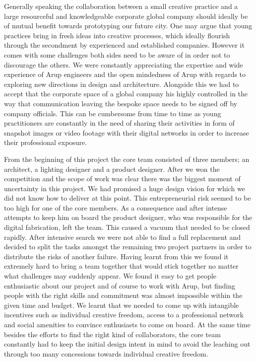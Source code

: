 Generally speaking the collaboration between a small creative practice and a large resourceful and knowledgeable corporate global company should ideally be of mutual benefit towards prototyping our future city. One may argue that young practices bring in fresh ideas into creative processes, which ideally flourish through the secondment by experienced and established companies. However it comes with some challenges both sides need to be aware of in order not to discourage the others. We were constantly appreciating the expertise and wide experience of Arup engineers and the open mindedness of Arup with regards to exploring new directions in design and architecture. Alongside this we had to accept that the corporate space of a global company his highly controlled in the way that communication leaving the bespoke space needs to be signed off by company officials. This can be cumbersome from time to time as young practitioners are constantly in the need of sharing their activities in form of snapshot images or video footage with their digital networks in order to increase their professional exposure.   

From the beginning of this project the core team consisted of three members; an architect, a lighting designer and a product designer. After we won the competition and the scope of work was clear there was the biggest moment of uncertainty in this project. We had promised a huge design vision for which we did not know how to deliver at this point. This entrepreneurial risk seemed to be too high for one of the core members. As a consequence and after intense attempts to keep him on board the product designer, who was responsible for the digital fabrication, left the team. This caused a vacuum that needed to be closed rapidly. After intensive search we were not able to find a full replacement and decided to split the tasks amongst the remaining two project partners in order to distribute the risks of another failure. Having learnt from this we found it extremely hard to bring a team together that would stick together no matter what challenges may suddenly appear. We found it easy to get people enthusiastic about our project and of course to work with Arup, but finding people with the right skills and commitment was almost impossible within the given time and budget. We learnt that we needed to come up with intangible incentives such as individual creative freedom, access to a professional network and social amenities to convince enthusiasts to come on board. At the same time besides the efforts to find the right kind of collaborators, the core team constantly had to keep the initial design intent in mind to avoid the leaching out through too many concessions towards individual creative freedom. 

